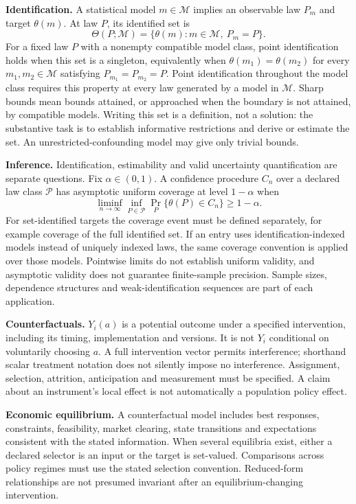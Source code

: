 \documentclass[11pt,a4paper]{article}
\begin{document}
\textbf{Identification.} A statistical model $m\in\mathcal M$ implies an observable law $P_m$ and target $\theta(m)$. At law $P$, its identified set is
\[
\Theta(P;\mathcal M)=\{\theta(m):m\in\mathcal M,\ P_m=P\}.
\]
For a fixed law $P$ with a nonempty compatible model class, point identification holds when this set is a singleton, equivalently when $\theta(m_1)=\theta(m_2)$ for every $m_1,m_2\in\mathcal M$ satisfying $P_{m_1}=P_{m_2}=P$. Point identification throughout the model class requires this property at every law generated by a model in $\mathcal M$. Sharp bounds mean bounds attained, or approached when the boundary is not attained, by compatible models. Writing this set is a definition, not a solution: the substantive task is to establish informative restrictions and derive or estimate the set. An unrestricted-confounding model may give only trivial bounds.

\textbf{Inference.} Identification, estimability and valid uncertainty quantification are separate questions. Fix $\alpha\in(0,1)$. A confidence procedure $C_n$ over a declared law class $\mathcal P$ has asymptotic uniform coverage at level $1-\alpha$ when
\[
\liminf_{n\to\infty}\inf_{P\in\mathcal P}\Pr_P\{\theta(P)\in C_n\}\geq1-\alpha.
\]
For set-identified targets the coverage event must be defined separately, for example coverage of the full identified set. If an entry uses identification-indexed models instead of uniquely indexed laws, the same coverage convention is applied over those models. Pointwise limits do not establish uniform validity, and asymptotic validity does not guarantee finite-sample precision. Sample sizes, dependence structures and weak-identification sequences are part of each application.

\textbf{Counterfactuals.} $Y_i(a)$ is a potential outcome under a specified intervention, including its timing, implementation and versions. It is not $Y_i$ conditional on voluntarily choosing $a$. A full intervention vector permits interference; shorthand scalar treatment notation does not silently impose no interference. Assignment, selection, attrition, anticipation and measurement must be specified. A claim about an instrument's local effect is not automatically a population policy effect.

\textbf{Economic equilibrium.} A counterfactual model includes best responses, constraints, feasibility, market clearing, state transitions and expectations consistent with the stated information. When several equilibria exist, either a declared selector is an input or the target is set-valued. Comparisons across policy regimes must use the stated selection convention. Reduced-form relationships are not presumed invariant after an equilibrium-changing intervention.
\end{document}
